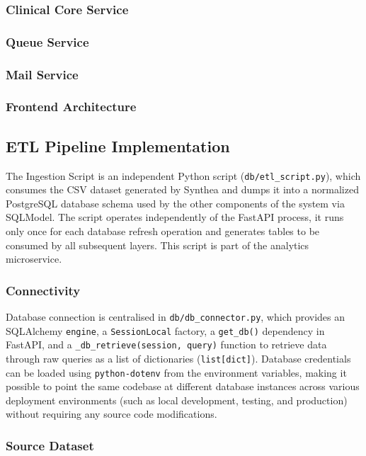 \subsubsection*{Clinical Core Service}
\subsubsection*{Queue Service}
\subsubsection*{Mail Service}

\subsubsection{Frontend Architecture}

\clearpage


\subsection{ETL Pipeline Implementation}

The Ingestion Script is an independent Python script (\texttt{db/etl\_script.py}), which consumes the CSV dataset generated by Synthea and dumps it into a normalized PostgreSQL database schema used by the other components of the system via SQLModel. The script operates independently of the FastAPI process, it runs only once for each database refresh operation and generates tables to be consumed by all subsequent layers. This script is part of the analytics microservice.

\subsubsection*{Connectivity}

Database connection is centralised in \texttt{db/db\_connector.py}, which provides an SQLAlchemy \texttt{engine}, a \texttt{SessionLocal} factory, a \texttt{get\_db()} dependency in FastAPI, and a \texttt{\_db\_retrieve(session, query)} function to retrieve data through raw queries as a list of dictionaries (\texttt{list[dict]}). Database credentials can be loaded using \texttt{python-dotenv} from the environment variables, making it possible to point the same codebase at different database instances across various deployment environments (such as local development, testing, and production) without requiring any source code modifications.

\subsubsection*{Source Dataset}

